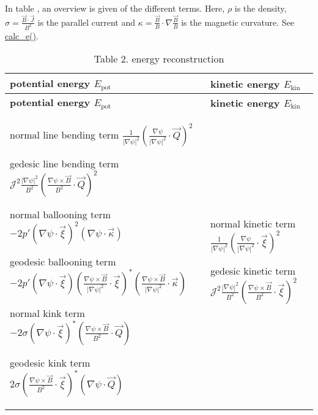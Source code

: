 In table , an overview is given of the different terms. Here, $\rho$ is the density, $\sigma = \frac{\vec{B}\cdot\vec{J}}{B^2}$ is the parallel current and $\kappa = \frac{\vec{B}}{B} \cdot \nabla \frac{\vec{B}}{B}$ is the magnetic curvature. See \hyperlink{namespacesol__ops_aaeb4b122754fc6a4f538b22d72b6cba0}{calc\+\_\+e()}.

\hypertarget{page_outputs_e_rec_tab}{}
\tabulinesep=1mm
\begin{longtabu} spread 0pt [c]{*{2}{|X[-1]}|}
\caption{Table 2. energy reconstruction}\label{page_outputs_e_rec_tab}\\
\hline
\rowcolor{\tableheadbgcolor}\textbf{ potential energy $E_\text{pot}$ }&\textbf{ kinetic energy $E_\text{kin}$  }\\
\endfirsthead
\hline
\endfoot
\hline
\rowcolor{\tableheadbgcolor}\textbf{ potential energy $E_\text{pot}$ }&\textbf{ kinetic energy $E_\text{kin}$  }\\
\endhead

\begin{DoxyItemize}
\item normal line bending term $\frac{1}{\left|\nabla\psi\right|^2 }\left(\frac{\nabla \psi}{\left|\nabla \psi\right|^2}\cdot \vec{Q}\right)^2$  
\item gedesic line bending term $\mathcal{J}^2\frac{\left|\nabla \psi\right|^2}{B^2} \left( \frac{\nabla \psi \times \vec{B}}{B^2}\cdot \vec{Q} \right)^2$  
\item normal ballooning term $-2 p' \left(\nabla \psi \cdot \vec{\xi}\right)^2 \left(\nabla \psi \cdot \vec{\kappa}\right)$  
\item geodesic ballooning term $-2 p' \left( \nabla \psi \cdot \vec{\xi} \right) \left( \frac{\nabla \psi \times \vec{B}}{\left|\nabla \psi \right|^2} \cdot \vec{\xi}\right)^* \left(\frac{\nabla \psi \times \vec{B}}{\left|\nabla \psi \right|^2} \cdot \vec{\kappa}\right)$  
\item normal kink term $-2 \sigma \left(\nabla \psi \cdot \vec{\xi}\right)^* \left(\frac{\nabla \psi \times \vec{B}}{B^2}\cdot \vec{Q} \right)$  
\item geodesic kink term $ 2 \sigma \left(\frac{\nabla \psi \times \vec{B}}{B^2} \cdot \vec{\xi}\right)^* \left(\nabla \psi\cdot \vec{Q} \right)$  
\end{DoxyItemize}&
\begin{DoxyItemize}
\item normal kinetic term $\frac{1}{\left|\nabla\psi\right|^2 }\left(\frac{\nabla \psi}{\left|\nabla \psi\right|^2}\cdot \vec{\xi}\right)^2$  
\item gedesic kinetic term $\mathcal{J}^2\frac{\left|\nabla \psi\right|^2}{B^2} \left( \frac{\nabla \psi \times \vec{B}}{B^2}\cdot \vec{\xi} \right)^2$  
\end{DoxyItemize}\\
\end{longtabu}
